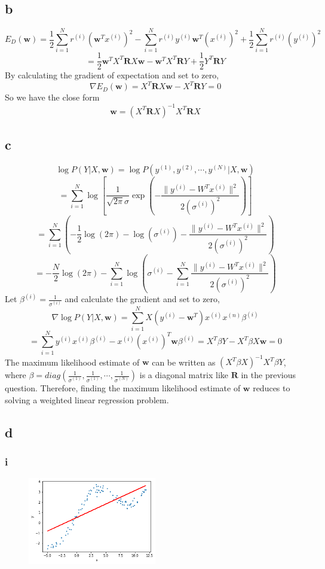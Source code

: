 \documentclass{article}
\begin{document}
\subsection*{b}
$$E_D(\mathbf{w}) = \frac{1}{2} \sum_{i=1}^{N} r^{(i)}(\mathbf{w}^T x^{(i)})^2 - \sum_{i=1}^{N}r^{(i)}y^{(i)} \mathbf{w}^T (x^{(i)})^2 + \frac{1}{2} \sum_{i=1}^{N} r^{(i)}(y^{(i)})^2$$
$$= \frac{1}{2}\mathbf{w}^TX^T \mathbf{R} X\mathbf{w} - \mathbf{w}^TX^T \mathbf{R}Y + \frac{1}{2}Y^T\mathbf{R}Y$$
By calculating the gradient of expectation and set to zero,
$$\nabla E_D(\mathbf{w}) = X^T \mathbf{R}X\mathbf{w} - X^T\mathbf{R}Y = 0$$
So we have the close form
$$\mathbf{w} = (X^T\mathbf{R}X)^{-1}X^T\mathbf{R}X$$
\subsection*{c}
$$\log P(Y|X, \mathbf{w}) = \log P(y^{(1)}, y^{(2)}, \cdots, y^{(N)}|X, \mathbf{w})$$
$$= \sum_{i=1}^{N} \log [\frac{1}{\sqrt{2 \pi} \sigma} \exp (-\frac{\|y^{(i)}-W^{T} x^{(i)}\|^{2}}{2(\sigma^{(i)})^{2}})]$$
$$= \sum_{i=1}^{N} (-\frac{1}{2}\log(2\pi) - \log(\sigma^{(i)}) - \frac{\|y^{(i)}-W^{T} x^{(i)}\|^{2}}{2(\sigma^{(i)})^{2}})$$
$$= -\frac{N}{2}\log(2\pi) - \sum_{i=1}^{N} \log(\sigma^{(i)} - \sum_{i=1}^{N} \frac{\|y^{(i)}-W^{T} x^{(i)}\|^{2}}{2(\sigma^{(i)})^{2}})$$
Let $\beta^{(i)} = \frac{1}{\sigma^{(i)}}$ and calculate the gradient and set to zero,
$$\nabla \log P(Y|X, \mathbf{w}) = \sum_{i=1}^{N} X(y^{(i)} - \mathbf{w}^T)x^{(i)}x^{(n)}\beta^{(i)}$$
$$= \sum_{i=1}^{N} y^{(i)}x^{(i)}\beta^{(i)} - x^{(i)}(x^{(i)})^T \mathbf{w} \beta^{(i)} = X^T\beta Y - X^T\beta X\mathbf{w} = 0$$
The maximum likelihood estimate of $\mathbf{w}$ can be written as $(X^T\beta X)^{-1}X^T\beta Y$, where $\beta = diag(\frac{1}{\sigma^{(1)}}, \frac{1}{\sigma^{(1)}}, \cdots, \frac{1}{\sigma^{(N)}})$ is a diagonal matrix like $\mathbf{R}$ in the previous question. Therefore, finding the maximum likelihood estimate of $\mathbf{w}$ reduces to solving a weighted linear regression problem.

\newpage

\subsection*{d}
\subsubsection*{i}
\begin{figure}[htbp]
    \centering
    \includegraphics[width=0.5\textwidth]{2di.png}
\end{figure}
\end{document}
